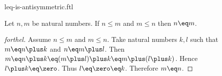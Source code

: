 \documentclass{stex}
\begin{document}
\begin{smodule}{leq-is-antisymmetric.ftl}


\begin{proposition}[forthel,id=LeqIsAntisymmetricProp]
  Let $n, m$ be natural numbers.
  If $n \leq m$ and $m \leq n$ then $n \eq m$.
\end{proposition}
\begin{proof}[forthel]
  Assume $n \leq m$ and $m \leq n$.
  Take natural numbers $k, l$ such that $m \eq n \plus k$ and $n \eq m \plus l$.
  Then $m
    \eq n \plus k
    \eq (m \plus l) \plus k
    \eq m \plus (l \plus k)$.
  Hence $l \plus k \eq \zero$.
  Thus $l \eq \zero \eq k$.
  Therefore $m \eq n$.
\end{proof}

\end{smodule}
\end{document}
